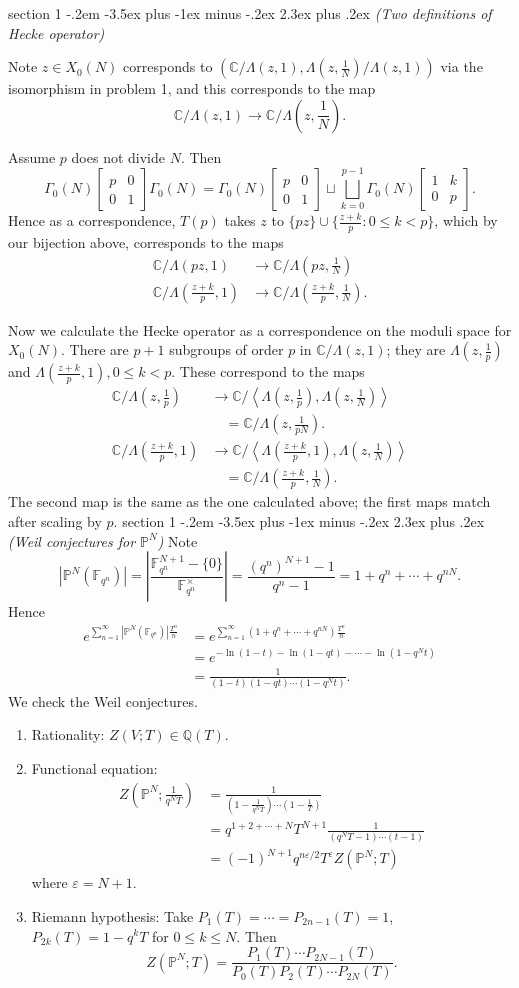 \documentclass[12pt]{article}
\makeatletter
\theoremstyle{norm}
\newcommand{\C}[0]{\mathbb{C}}
\newcommand{\F}[0]{\mathbb{F}}
\newcommand{\Pj}[0]{\mathbb{P}}
\newcommand{\Q}[0]{\mathbb{Q}}
\newcommand{\rc}[1]{\frac{1}{#1}}
\newcommand{\Ga}[0]{\Gamma}
\newcommand{\ep}[0]{\varepsilon}
\newcommand{\La}[0]{\Lambda}
\newcommand{\ab}[1]{\left| {#1} \right|}
\newcommand{\pa}[1]{\left( {#1} \right)}
\newcommand{\an}[1]{\left\langle {#1}\right\rangle}
\newcommand{\matt}[4]{
\left[
\begin{matrix}
{#1}&{#2}\\
{#3}&{#4}
\end{matrix}
\right]}
\newcommand{\iy}[0]{\infty}
\newenvironment{problem}{\@startsection
       {section}
       {1}
       {-.2em}
       {-3.5ex plus -1ex minus -.2ex}
       {2.3ex plus .2ex}
       {\pagebreak[3]%
       \large\bf\noindent{Problem }
       }
       }
       {%
       }
\makeatother
\begin{document}
\begin{problem}{\it (Two definitions of Hecke operator)}

Note $z\in X_0(N)$ corresponds to $(\C/\La(z,1),\La(z,\rc N)/\La(z,1))$ via the isomorphism in problem 1, and this corresponds to the map
\[
\C/\La(z,1)\to \C/\La(z,\rc N).
\]

Assume $p$ does not divide $N$.
Then
\[
\Ga_0(N)
\matt{p}00{1}
\Ga_0(N)=
\Ga_0(N)\matt p001 \sqcup \bigsqcup_{k=0}^{p-1}\Ga_0(N)\matt 1k0p.
\]
Hence as a correspondence, $T(p)$ takes $z$ to $\{pz\}\cup \{\frac{z+k}{p}:0\leq k<p\}$, which by our bijection above, corresponds to the maps
\begin{align*}
\C/\La(pz,1)&\to \C/\La(pz,\rc N)\\
\C/\La(\frac{z+k}{p},1)&\to \C/\La(\frac{z+k}{p},\rc N).
\end{align*}

Now we calculate the Hecke operator as a correspondence on the moduli space for $X_0(N)$. 
There are $p+1$ subgroups of order $p$ in $\C/\La(z,1)$; they are $\La(z,\rc p)$ and $\La(\frac{z+k}{p},1),0\le k<p$. These correspond to the maps
\begin{align*}
\C/\La(z,\rc p)&\to \C/\an{\La(z,\rc p),\La(z, \rc N)}\\
&\quad = \C/\La(z,\rc{pN}).\\
\C/\La(\frac{z+k}{p}, 1)&\to \C/\an{\La(\frac{z+k}{p},1),\La(z,\rc N)}\\
&\quad = \C/\La(\frac{z+k}{p},\rc N).
\end{align*}
The second map is the same as the one calculated above; the first maps match after scaling by $p$.
\end{problem}
\begin{problem}{\it (Weil conjectures for $\Pj^N$)}
Note
\[
|\Pj^N(\F_{q^n})|=\ab{\frac{\F_{q^n}^{N+1}-\{0\}}{\F_{q^n}^{\times}}}
=\frac{(q^n)^{N+1}-1}{q^n-1}
=1+q^n+\cdots +q^{nN}.
\]
Hence
\begin{align*}
e^{\sum_{n=1}^{\iy} |\Pj^N(\F_{q^n})|\frac{T^n}{n}}
&=e^{\sum_{n=1}^{\iy} (1+q^n+\cdots +q^{nN})\frac{T^n}{n}}\\
&=e^{-\ln(1-t)-\ln(1-qt)-\cdots -\ln(1-q^Nt)}\\
&=\frac{1}{(1-t)(1-qt)\cdots (1-q^Nt)}.
\end{align*}
We check the Weil conjectures.
\begin{enumerate}
\item
Rationality: $Z(V;T)\in \Q(T)$.
\item
Functional equation:
\begin{align*}
Z\pa{\Pj^N;\rc{q^NT}}&=\rc{\pa{1-\rc{q^NT}}\cdots \pa{1-\rc T}}\\
&=q^{1+2+\cdots +N} T^{N+1}\rc{(q^NT-1)\cdots (t-1)}\\
&=(-1)^{N+1}q^{n\ep/2} T^{\ep}Z(\Pj^N;T)
\end{align*}
where $\ep=N+1$.
\item 
Riemann hypothesis:
Take $P_1(T)=\cdots =P_{2n-1}(T)=1$, $P_{2k}(T)=1-q^{k}T$ for $0\le k\le N$. Then
\[
Z(\Pj^N;T)=\frac{P_1(T)\cdots P_{2N-1}(T)}{P_0(T)P_2(T)\cdots P_{2N}(T)}.
\]
\end{enumerate}
\end{problem}
\end{document}
